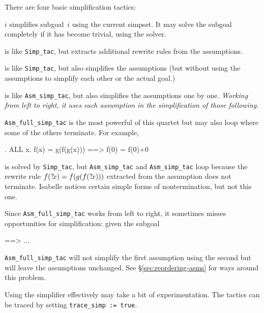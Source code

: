 There are four basic simplification tactics:
\begin{ttdescription}
\item[\ttindexbold{Simp_tac} $i$] simplifies subgoal~$i$ using the current
  simpset.  It may solve the subgoal completely if it has become trivial,
  using the solver.
  
\item[\ttindexbold{Asm_simp_tac}]
  is like \verb$Simp_tac$, but extracts additional rewrite rules from the
  assumptions.

\item[\ttindexbold{Full_simp_tac}] is like \verb$Simp_tac$, but also
  simplifies the assumptions (but without using the assumptions to simplify
  each other or the actual goal.)

\item[\ttindexbold{Asm_full_simp_tac}]
  is like \verb$Asm_simp_tac$, but also simplifies the assumptions one by
  one.  {\em Working from left to right, it uses each assumption in the
  simplification of those following.}
\end{ttdescription}

{\tt Asm_full_simp_tac} is the most powerful of this quartet but may also
loop where some of the others terminate. For example,
\begin{ttbox}
{. ALL x. f(x) = g(f(g(x))) ==> f(0) = f(0)+0}
\end{ttbox}
is solved by {\tt Simp_tac}, but {\tt Asm_simp_tac} and {\tt Asm_simp_tac}
loop because the rewrite rule $f({?\!x}) = f(g(f({?\!x})))$ extracted from
the assumption does not terminate. Isabelle notices certain simple forms of
nontermination, but not this one.
 
\begin{warn}
  Since \verb$Asm_full_simp_tac$ works from left to right, it sometimes
misses opportunities for simplification: given the subgoal
\begin{ttbox}
{\out [| P(f(a)); f(a) = t |] ==> ...}
\end{ttbox}
\verb$Asm_full_simp_tac$ will not simplify the first assumption using the
second but will leave the assumptions unchanged. See
\S\ref{sec:reordering-asms} for ways around this problem.
\end{warn}

Using the simplifier effectively may take a bit of experimentation.
 The tactics can
be traced by setting \verb$trace_simp := true$.

